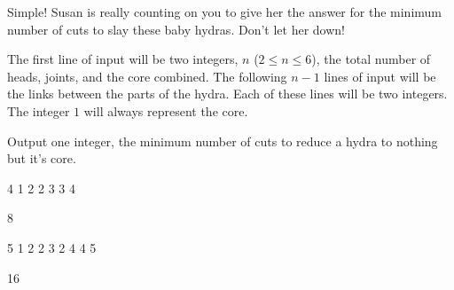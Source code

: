 Simple!
Susan is really counting on you to give her the answer for the minimum number of cuts to slay these baby hydras.
Don't let her down!

\begin{formalin}
The first line of input will be two integers, $n$ ($2 \leq n \leq 6$), the total number of heads, joints, and the core combined.
The following $n-1$ lines of input will be the links between the parts of the hydra.
Each of these lines will be two integers.
The integer $1$ will always represent the core.
\end{formalin}

\begin{formalout}
Output one integer, the minimum number of cuts to reduce a hydra to nothing but it's core.
\end{formalout}

\begin{datain}
4
1 2
2 3
3 4
\end{datain}
\begin{dataout}
8
\end{dataout}

\begin{datain}
5
1 2
2 3
2 4
4 5
\end{datain}
\begin{dataout}
16
\end{dataout}
